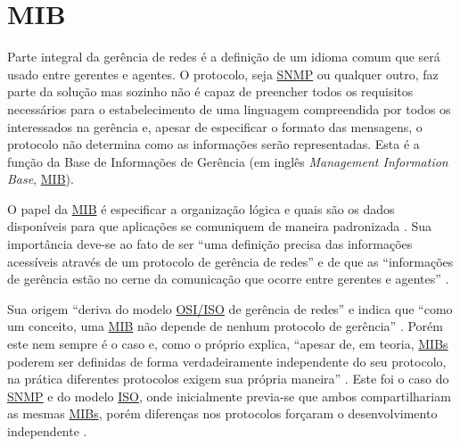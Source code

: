 \documentclass[twoside,english,brazilian]{UNISINOSmonografia}
\begin{document}
\section{MIB}

Parte integral da gerência de redes é a definição de um idioma comum que será 
usado entre gerentes e agentes. O protocolo, seja \hyperref[siglas]{SNMP} ou qualquer outro, faz 
parte da solução mas sozinho não é capaz de preencher todos os requisitos 
necessários para o estabelecimento de uma linguagem compreendida por todos os 
interessados na gerência e, apesar de especificar o formato das mensagens, o 
protocolo não determina como as informações serão representadas.
Esta é a função da Base de Informações de Gerência 
(em inglês \textit{Management Information Base}, \hyperref[siglas]{MIB}).

O papel da \hyperref[siglas]{MIB} é especificar a organização lógica e quais são os dados 
disponíveis para que aplicações se comuniquem de maneira padronizada 
\cite{Silva2005}.
Sua importância deve-se ao fato de ser 
``uma definição precisa das informações acessíveis através de um protocolo de 
gerência de redes''
\cite[p.~152]{Leinwand1996} 
e de que as
``informações de gerência estão no cerne da comunicação que ocorre entre 
gerentes e agentes''
\cite[p.~227]{Clemm2006}.

Sua origem ``deriva do modelo \hyperref[siglas]{OSI/ISO} de gerência de redes''
\cite[p.~46]{Ding2009} 
e indica que
``como um conceito, uma \hyperref[siglas]{MIB} não depende de nenhum protocolo de gerência''
\cite[p.~222]{Clemm2006}.
Porém este nem sempre é o caso e, como o próprio  
explica, 
``apesar de, em teoria, \hyperref[siglas]{MIBs} poderem ser definidas de forma verdadeiramente 
independente do seu protocolo, na prática diferentes protocolos exigem sua 
própria maneira''
.
Este foi o caso do \hyperref[siglas]{SNMP} e do modelo \hyperref[siglas]{ISO}, onde inicialmente previa-se que ambos 
compartilhariam as mesmas \hyperref[siglas]{MIBs}, porém diferenças nos protocolos forçaram o 
desenvolvimento independente \cite{Hunt1997,stallings1999snmp,Leinwand1996}.
\end{document}
